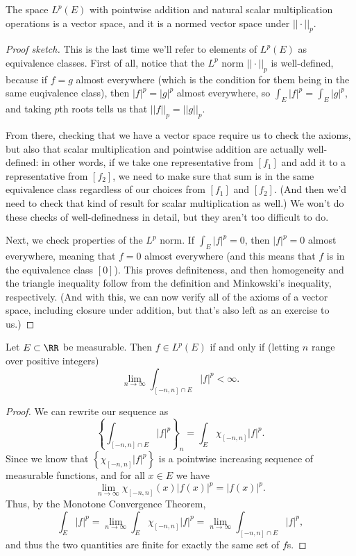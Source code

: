 \begin{theorem}
The space $L^p(E)$ with pointwise addition and natural scalar multiplication operations is a vector space, and it is a normed vector space under $||\cdot||_p$.
\end{theorem}
 
\begin{proof}[Proof sketch]
This is the last time we'll refer to elements of $L^p(E)$ as equivalence classes. First of all, notice that the $L^p$ norm $||\cdot||_p$ is well-defined, because if $f = g$ almost everywhere (which is the condition for them being in the same euqivalence class), then $|f|^p = |g|^p$ almost everywhere, so $\int_E |f|^p = \int_E |g|^p$, and taking $p$th roots tells us that $||f||_p = ||g||_p$.

From there, checking that we have a vector space require us to check the axioms, but also that scalar multiplication and pointwise addition are actually well-defined: in other words, if we take one representative from $[f_1]$ and add it to a representative from $[f_2]$, we need to make sure that sum is in the same equivalence class regardless of our choices from $[f_1]$ and $[f_2]$. (And then we'd need to check that kind of result for scalar multiplication as well.) We won't do these checks of well-definedness in detail, but they aren't too difficult to do.

Next, we check properties of the $L^p$ norm. If $\int_E |f|^p = 0$, then $|f|^p = 0$ almost everywhere, meaning that $f = 0$ almost everywhere (and this means that $f$ is in the equivalence class $[0]$). This proves definiteness, and then homogeneity and the triangle inequality follow from the definition and Minkowski's inequality, respectively. (And with this, we can now verify all of the axioms of a vector space, including closure under addition, but that's also left as an exercise to us.)
\end{proof}

\begin{proposition}
Let $E \subset \RR$ be measurable. Then $f \in L^p(E)$ if and only if (letting $n$ range over positive integers)
\[
    \lim_{n \to \infty} \int_{[-n, n] \cap E} |f|^p < \infty.
\]
\end{proposition}
\begin{proof}
We can rewrite our sequence as
\[
    \left\{\int_{[-n, n] \cap E} |f|^p\right\}_n = \int_E \chi_{[-n, n]} |f|^p.
\]
Since we know that $\left\{\chi_{[-n, n]} |f|^p\right\}$ is a pointwise increasing sequence of measurable functions, and for all $x \in E$ we have
\[
    \lim_{n \to \infty} \chi_{[-n, n]}(x) |f(x)|^p = |f(x)|^p.
\]
Thus, by the Monotone Convergence Theorem, 
\[
    \int_E |f|^p = \lim_{n \to \infty} \int_E \chi_{[-n, n]} |f|^p =  \lim_{n \to \infty} \int_{[-n, n] \cap E} |f|^p,
\]
and thus the two quantities are finite for exactly the same set of $f$s. 
\end{proof}

